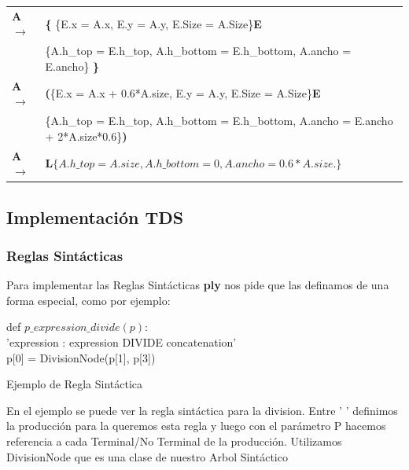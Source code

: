 \begin{center}
\begin{tabular}{ l  l }
  \textbf{A} $\rightarrow$ &  \textbf{\{} \{E.x = A.x, E.y = A.y, E.Size = A.Size\}\textbf{E} \\
  & \{A.h\_top = E.h\_top, A.h\_bottom = E.h\_bottom, A.ancho = E.ancho\} \textbf{\}} \\ 
  

        
  \textbf{A} $\rightarrow$ &   \textbf{(}\{E.x = A.x + 0.6*A.size, E.y = A.y, E.Size = A.Size\}\textbf{E} \\
  & \{A.h\_top = E.h\_top, A.h\_bottom = E.h\_bottom, A.ancho = E.ancho + 2*A.size*0.6\}\textbf{)}  \\ 
  
  \textbf{A} $\rightarrow$ &  $\textbf{L} \{A.h\_top = A.size, A.h\_bottom = 0, A.ancho = 0.6 * A.size.\}$\\
  

\end{tabular}
\end{center}

\subsection{Implementaci\'on TDS}
\subsubsection{Reglas Sint\'acticas}
Para implementar las Reglas Sint\'acticas \textbf{ply} nos pide que las definamos de una forma especial, como por ejemplo:

\begin{algorithm}[H]
 def $p\_expression\_divide(p)$: \\
    'expression : expression DIVIDE concatenation' \\
    p[0] = DivisionNode(p[1], p[3])
    \caption{Ejemplo de Regla Sint\'actica}
\end{algorithm}

En el ejemplo se puede ver la regla sint\'actica para la division. Entre ' ' definimos la producci\'on para la queremos esta regla y luego con el par\'ametro P hacemos referencia a cada Terminal/No Terminal de la producci\'on. 
Utilizamos DivisionNode que es una clase de nuestro Arbol Sint\'actico
